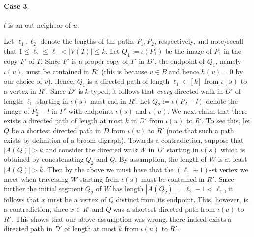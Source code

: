 \documentclass[a4paper,11pt]{article}
\makeatletter
\renewenvironment{proof}[1][\proofname] {\par\pushQED{\qed}\normalfont\topsep6\p@\@plus6\p@\relax\trivlist\item[\hskip\labelsep\bfseries#1\@addpunct{.}]\ignorespaces}{\popQED\endtrivlist\@endpefalse}
\theoremstyle{definition}
\makeatother
\begin{document}
\begin{proof}
    \paragraph{\textbf{Case 3.}} $l$ is an out-neighbor of $u$. 
    
    Let $\ell_1,\ell_2$ denote the lengths of the paths $P_1,P_2$, respectively, and note/recall that $1\le \ell_2\leq \ell_1< |V(T)|\le k$. Let $Q_1:=\iota(P_1)$ be the image of $P_1$ in the copy $F'$ of $T$. Since $F'$ is a proper copy of $T'$ in $D'$, the endpoint of $Q_1$, namely $\iota(v)$, must be contained in $R'$ (this is because $v\in B$ and hence $h(v)=0$ by our choice of $v$). Hence, $Q_1$ is a directed path of length $\ell_1\in [k]$ from $\iota(s)$ to a vertex in $R'$. Since $D'$ is $k$-typed, it follows that \emph{every} directed walk in $D'$ of length $\ell_1$ starting in $\iota(s)$ must end in $R'$. Let $Q_2:=\iota(P_2-l)$ denote the image of $P_2-l$ in $F'$ with endpoints $\iota(s)$ and $\iota(u)$. We next claim that there exists a directed path of length at most $k$ in $D'$ from $\iota(u)$ to $R'$. To see this, let $Q$ be a shortest directed path in $D$ from $\iota(u)$ to $R'$ (note that such a path exists by definition of a broom digraph). Towards a contradiction, suppose that $|A(Q)|>k$ and consider the directed walk $W$ in $D'$ starting in $\iota(s)$ which is obtained by concatenating $Q_2$ and $Q$. By assumption, the length of $W$ is at least $|A(Q)|>k$. Then by the above we must have that the $(\ell_1+1)$-st vertex we meet when traversing $W$ starting from $\iota(s)$ must be contained in $R'$. Since further the initial segment $Q_2$ of $W$ has length $|A(Q_2)|=\ell_2-1<\ell_1$, it follows that $x$ must be a vertex of $Q$ distinct from its endpoint. This, however, is a contradiction, since $x\in R'$ and $Q$ was a shortest directed path from $\iota(u)$ to $R'$. This shows that our above assumption was wrong, there indeed exists a directed path in $D'$ of length at most $k$ from $\iota(u)$ to $R'$.
    

\end{proof}
\end{document}
